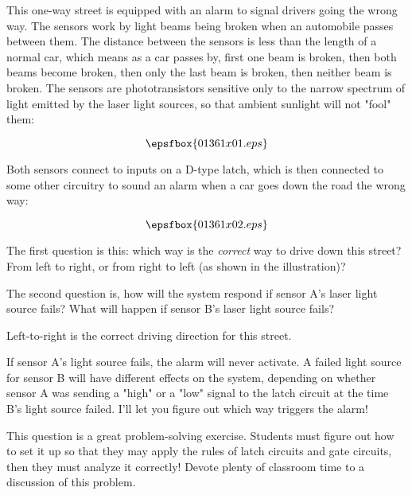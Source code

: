 

This one-way street is equipped with an alarm to signal drivers going the wrong way.  The sensors work by light beams being broken when an automobile passes between them.  The distance between the sensors is less than the length of a normal car, which means as a car passes by, first one beam is broken, then both beams become broken, then only the last beam is broken, then neither beam is broken.  The sensors are phototransistors sensitive only to the narrow spectrum of light emitted by the laser light sources, so that ambient sunlight will not "fool" them:

$$\epsfbox{01361x01.eps}$$

Both sensors connect to inputs on a D-type latch, which is then connected to some other circuitry to sound an alarm when a car goes down the road the wrong way:

$$\epsfbox{01361x02.eps}$$

The first question is this: which way is the {\it correct} way to drive down this street?  From left to right, or from right to left (as shown in the illustration)?

\vskip 10pt

The second question is, how will the system respond if sensor A's laser light source fails?  What will happen if sensor B's laser light source fails?







Left-to-right is the correct driving direction for this street.

\vskip 10pt

If sensor A's light source fails, the alarm will never activate.  A failed light source for sensor B will have different effects on the system, depending on whether sensor A was sending a "high" or a "low" signal to the latch circuit at the time B's light source failed.  I'll let you figure out which way triggers the alarm!







This question is a great problem-solving exercise.  Students must figure out how to set it up so that they may apply the rules of latch circuits and gate circuits, then they must analyze it correctly!  Devote plenty of classroom time to a discussion of this problem.

